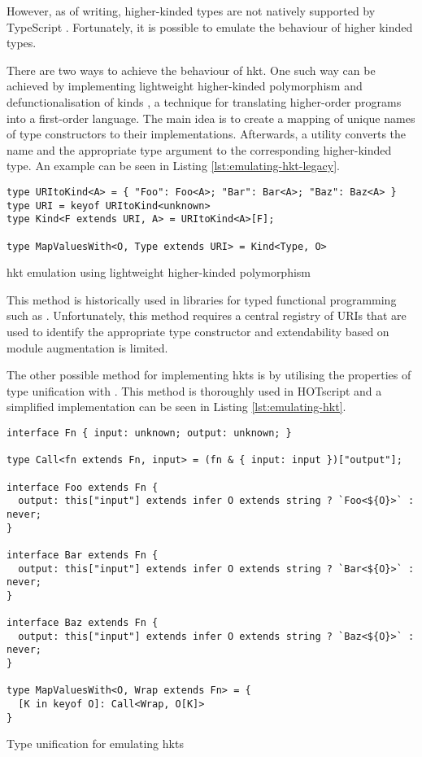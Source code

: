However, as of writing, higher-kinded types are not natively supported by TypeScript \cite{DocumentationTypeScriptFunctional}. Fortunately, it is possible to emulate the behaviour of higher kinded types.

There are two ways to achieve the behaviour of \acrshort{hkt}. One such way can be achieved by implementing lightweight higher-kinded polymorphism \cite{yallopLightweightHigherKindedPolymorphism2014} and defunctionalisation of kinds \cite{reynoldsDefinitionalInterpretersHigherorder1972}, a technique for translating higher-order programs into a first-order language. The main idea is to create a mapping of unique names of type constructors to their implementations. Afterwards, a  utility converts the name and the appropriate type argument to the corresponding higher-kinded type. An example can be seen in Listing \ref{lst:emulating-hkt-legacy}.

\begin{listing}[ht]
  \begin{verbatim}
type URItoKind<A> = { "Foo": Foo<A>; "Bar": Bar<A>; "Baz": Baz<A> }
type URI = keyof URItoKind<unknown>
type Kind<F extends URI, A> = URItoKind<A>[F];

type MapValuesWith<O, Type extends URI> = Kind<Type, O>
\end{verbatim}
  \caption{\acrshort{hkt} emulation using lightweight higher-kinded polymorphism}\label{lst:emulating-hkt-legacy}
\end{listing}

This method is historically used in libraries for typed functional programming such as  \cite{GcantiFptsFunctional}. Unfortunately, this method requires a central registry of URIs that are used to identify the appropriate type constructor and extendability based on module augmentation is limited.

The other possible method for implementing \acrshort{hkt}s is by utilising the properties of type unification with . This method is thoroughly used in HOTscript \cite{vergnaudHigherOrderTypeScriptHOTScript2023} and a simplified implementation can be seen in Listing \ref{lst:emulating-hkt}.

\begin{listing}[ht]
  \begin{verbatim}
interface Fn { input: unknown; output: unknown; }

type Call<fn extends Fn, input> = (fn & { input: input })["output"];

interface Foo extends Fn {
  output: this["input"] extends infer O extends string ? `Foo<${O}>` : never;
}

interface Bar extends Fn {
  output: this["input"] extends infer O extends string ? `Bar<${O}>` : never;
}

interface Baz extends Fn {
  output: this["input"] extends infer O extends string ? `Baz<${O}>` : never;
}

type MapValuesWith<O, Wrap extends Fn> = {
  [K in keyof O]: Call<Wrap, O[K]>
}
\end{verbatim}
  \caption{Type unification for emulating \acrshort{hkt}s}\label{lst:emulating-hkt}
\end{listing}

